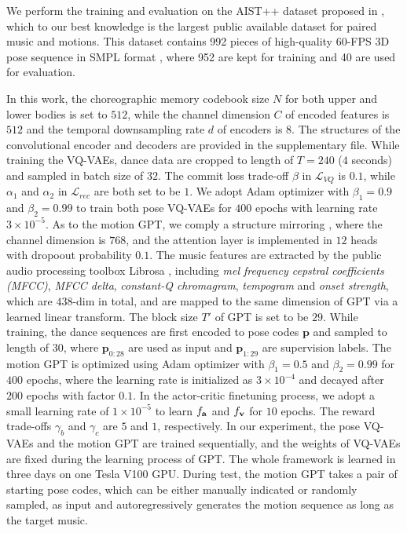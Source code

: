We perform the training and evaluation on the AIST++ dataset proposed in \cite{Li2021LearnTD}, which to our best knowledge is the largest public available dataset for paired music and motions. 
This dataset contains 992 pieces of high-quality $60$-FPS 3D pose sequence in SMPL format \cite{SMPL:2015}, where 952 are kept for training and 40 are used for evaluation.


In this work, the choreographic memory codebook size $N$ for both upper and lower bodies is set to $512$, while the channel dimension $C$ of encoded features is $512$ and the temporal downsampling rate $d$ of encoders is $8$.
The structures of the convolutional encoder and decoders are provided in the supplementary file.
While training the VQ-VAEs,  dance data are cropped to length of $T=240$ ($4$ seconds)  and sampled in batch size of $32$.
The commit loss trade-off $\beta$ in $\mathcal L_{VQ}$ is $0.1$, while  $\alpha_1$ and $\alpha_2$ in $\mathcal L_{rec}$ are both set to be $1$.
We adopt Adam optimizer \cite{kingma2014adam} with $\beta_1=0.9$ and $\beta_2=0.99$ to train both pose VQ-VAEs for $400$ epochs with learning rate $3\times10^{-5}$.
As to the motion GPT, we comply a structure mirroring \cite{mingpt}, where the channel dimension is $768$, and the attention layer is implemented in $12$ heads with  dropoout probability $0.1$.
The music features are extracted by the public audio processing toolbox Librosa \cite{jin2017towards}, including \emph{mel frequency cepstral
coefficients (MFCC)}, \emph{MFCC delta}, \emph{constant-Q chromagram}, \emph{tempogram} and \emph{onset strength}, which are $438$-dim in total, and are mapped to the same dimension of GPT via a learned linear transform.
The block size $T'$ of GPT is set to be $29$. 
While training, the dance sequences are first encoded to pose codes $\bm p$ and sampled to length of $30$, where $\bm p_{0:28}$ are used as input and $\bm p_{1:29}$ are supervision labels.
The motion GPT is optimized using Adam optimizer with $\beta_1=0.5$ and $\beta_2=0.99$ for $400$ epochs, where the learning rate is initialized as $3\times10^{-4}$ and decayed after $200$ epochs with factor $0.1$.
In the actor-critic finetuning process, we adopt a small learning rate of $1\times 10^{-5}$ to learn $f_{\bf a}$ and $f_{\bf v}$ for $10$ epochs.
The reward trade-offs $\gamma_b$ and $\gamma_c$ are $5$ and $1$, respectively.
In our experiment, the pose VQ-VAEs and the motion GPT are trained sequentially, and the weights of VQ-VAEs are fixed during the learning process of GPT.
The whole framework is learned in three days on one Tesla V100 GPU.
During test, the motion GPT takes a pair of starting pose codes, which can be either manually indicated or randomly sampled, as input and autoregressively generates the motion sequence as long as the target music.

